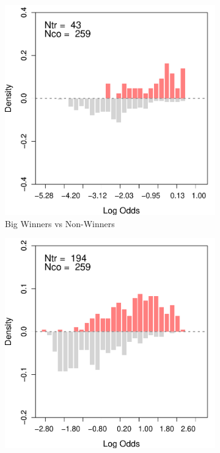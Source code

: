 \documentclass[letterpaper,12pt,leqno]{article}
\begin{document}
\begin{figure}[!ht]
    \caption{Assessing Overlap in IRS Data}\label{fig:irs.overlap}
    \centering
    \vspace{-0.5em}
    \begin{minipage}[c]{.9\linewidth}
        \centering
        \hspace{-2em}\begin{subfigure}{0.45\linewidth}
            \includegraphics[width=\linewidth]{irs1_odds.pdf}
            \caption{Big Winners vs Non-Winners}
        \end{subfigure}\hspace{1em}
        \begin{subfigure}{0.45\linewidth}
            \includegraphics[width=\linewidth]{irs2_odds.pdf}

\end{subfigure}
\end{minipage}
\end{figure}
\end{document}
